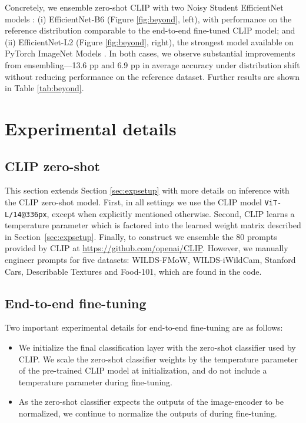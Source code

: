 Concretely, we ensemble zero-shot CLIP with two Noisy Student EfficientNet models \cite{xie2020self,tan2019efficientnet}: (i) EfficientNet-B6 (Figure \ref{fig:beyond}, left), with performance on the reference distribution comparable to the end-to-end fine-tuned CLIP model;
 and (ii) EfficientNet-L2 (Figure \ref{fig:beyond}, right), the strongest model available on PyTorch ImageNet Models \cite{rw2019timm}.
 In both cases, we observe substantial improvements from ensembling---13.6 pp and 6.9 pp in average accuracy under distribution shift without reducing performance on the reference dataset. Further results are shown in Table \ref{tab:beyond}.


\section{Experimental details}
\label{sec:appendix_hparam}

\subsection{CLIP zero-shot}\label{sec:morezs}

This section extends Section \ref{sec:expsetup} with more details on inference with the CLIP zero-shot model. First, in all settings we use the CLIP model \texttt{ViT-L/14@336px}, except when explicitly mentioned otherwise.
Second, CLIP learns a temperature parameter which is factored into the learned weight matrix  described in Section~\ref{sec:expsetup}. Finally, to construct  we ensemble the 80 prompts provided by CLIP at \url{https://github.com/openai/CLIP}. However, we manually engineer prompts for five datasets: WILDS-FMoW, WILDS-iWildCam, Stanford Cars, Describable Textures and Food-101, which are found in the code.

\subsection{End-to-end fine-tuning}
\label{sec:e2e-ft}

Two important experimental details for end-to-end fine-tuning are as follows:
\begin{itemize}
    \item We initialize the final classification layer with the zero-shot classifier used by CLIP. We scale the zero-shot classifier weights by the temperature parameter of the pre-trained CLIP model at initialization, and do not include a temperature parameter during fine-tuning.
    \item As the zero-shot classifier expects the outputs of the image-encoder  to be normalized, we continue to normalize the outputs of  during fine-tuning.
\end{itemize}


